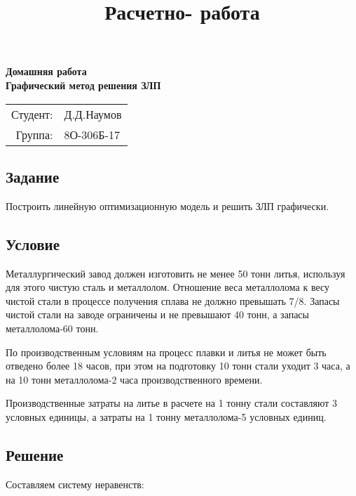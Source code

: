 \documentclass{article}
\title{Расчетно- работа}
\date{}
\begin{document}
\begin{titlepage}

\vspace{100pt}
\begin{center}
    \huge \textbf{Домашняя работа} \\
    \vspace{50pt}
    \huge \textbf{Графический метод решения ЗЛП}
\end{center}
\begin{flushright}

\vspace{350pt}
\begin{tabular}{rl}
     \Large Студент: & \Large Д.Д.Наумов \\
     \Large Группа: & \Large 8О-306Б-17 \\
\end{tabular}
\end{flushright}
\end{titlepage}


\subsection*{Задание}

Построить линейную оптимизационную модель и решить ЗЛП графически.

\subsection*{Условие}

Металлургический завод должен изготовить не менее 50 тонн литья, используя для этого чистую сталь и металлолом.  Отношение веса металлолома к весу чистой стали в процессе получения сплава не должно превышать 7/8. Запасы чистой стали на заводе ограничены и не превышают 40 тонн, а запасы металлолома-60 тонн.

По производственным условиям на процесс плавки и литья не может быть отведено более 18 часов, при этом на подготовку 10 тонн стали уходит 3 часа, а на 10 тонн металлолома-2 часа производственного времени.

Производственные затраты на литье в расчете на 1 тонну стали составляют 3 условных единицы, а затраты на 1 тонну металлолома-5 условных единиц.

\subsection{Решение}

Составляем систему неравенств:
\end{document}
